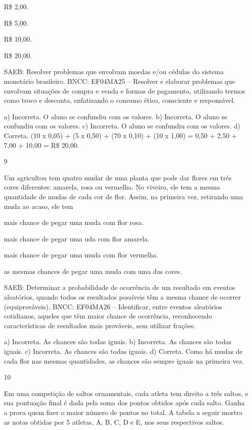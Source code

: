 \begin{mdframed}[linewidth=2pt,linecolor=salmao,roundcorner=2pt]
\begin{escolha}
{\begin{escolha}
\begin{escolha}
\item R\$ 2,00.
\item R\$ 5,00.
\item R\$ 10,00.
\item R\$ 20,00.

SAEB: Resolver problemas que envolvam moedas e/ou cédulas do
sistema monetário brasileiro.
BNCC: EF04MA25 -- Resolver e elaborar problemas que envolvam situações de compra e venda e formas
de pagamento, utilizando termos como troco e desconto, enfatizando o consumo ético, consciente e
responsável.

a) Incorreta. O aluno se confundiu com os valores.
b) Incorreta. O aluno se confundiu com os valores.
c) Incorreta. O aluno se confundiu com os valores.
d) Correta. (10 x 0,05) + (5 x 0,50) + (70 x 0,10) + (10 x 1,00) = 0,50 + 2,50 + 7,00 + 10,00 = R\$ 20,00.

\num{9}

Um agricultou tem quatro mudar de uma planta que pode dar flores em três cores diferentes: amarela, rosa ou vermelha. No viveiro, ele tem a mesma quantidade de mudas de cada cor de flor. Assim, na primeira vez, retirando uma muda ao acaso, ele tem

\begin{escolha}
\item mais chance de pegar uma muda com flor rosa.
\item mais chance de pegar uma uda com flor amarela.
\item mais chance de pegar uma muda com flor vermelha.
\item as mesmas chances de pegar uma muda com uma das cores.
\end{escolha}

SAEB: Determinar a probabilidade de ocorrência de um
resultado em eventos aleatórios, quando todos os resultados possíveis
têm a mesma chance de ocorrer (equiprováveis).
BNCC: EF04MA26 -- Identificar, entre eventos aleatórios cotidianos, aqueles que têm maior chance de
ocorrência, reconhecendo características de resultados mais prováveis, sem utilizar frações.

a) Incorreta. As chances são todas iguais.
b) Incorreta. As chances são todas iguais.
c) Incorreta. As chances são todas iguais.
d) Correta. Como há mudas de cada flor nas mesmas quantidades, as chances são sempre iguais na primeira vez.

\num{10}

Em uma competição de saltos ornamentais, cada atleta tem direito a três saltos,
e sua pontuação final é dada pela soma dos pontos obtidos após cada salto. Ganha a prova quem
fizer o maior número de pontos no total. A tabela a seguir mostra as notas obtidas por 5 atletas, A, B, C, D e E, nos seus respectivos saltos.


\end{escolha}
\end{escolha}}
\end{escolha}
\end{mdframed}
